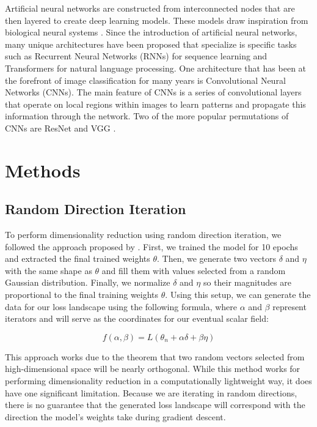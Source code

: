\documentclass{acmsiggraph}
\begin{document}
Artificial neural networks are constructed from interconnected nodes that are then layered to create deep learning models. These models draw inspiration from biological neural systems \cite{https://doi.org/10.48550/arxiv.1511.08458}. Since the introduction of artificial neural networks, many unique architectures have been proposed that specialize is specific tasks such as Recurrent Neural Networks (RNNs) for sequence learning and Transformers for natural language processing. One architecture that has been at the forefront of image classification for many years is Convolutional Neural Networks (CNNs). The main feature of CNNs is a series of convolutional layers that operate on local regions within images to learn patterns and propagate this information through the network. Two of the more popular permutations of CNNs are ResNet and VGG \cite{https://doi.org/10.48550/arxiv.1512.03385}. 

\section{Methods}
\label{sec:intro}
\subsection{Random Direction Iteration}
To perform dimensionality reduction using random direction iteration, we followed the approach proposed by \cite{NEURIPS2018_a41b3bb3}. First, we trained the model for 10 epochs and extracted the final trained weights $\theta$. Then, we generate two vectors $\delta$ and $\eta$ with the same shape as $\theta$ and fill them with values selected from a random Gaussian distribution. Finally, we normalize $\delta$ and $\eta$ so their magnitudes are proportional to the final training weights $\theta$. Using this setup, we can generate the data for our loss landscape using the following formula, where $\alpha$ and $\beta$ represent iterators and will serve as the coordinates for our eventual scalar field:

\begin{equation} \label{eq1}
f(\alpha, \beta) = L(\theta_n + \alpha\delta + \beta\eta) 
\end{equation}

This approach works due to the theorem that two random vectors selected from high-dimensional space will be nearly orthogonal. While this method works for performing dimensionality reduction in a computationally lightweight way, it does have one significant limitation. Because we are iterating in random directions, there is no guarantee that the generated loss landscape will correspond with the direction the model's weights take during gradient descent. 
\end{document}
